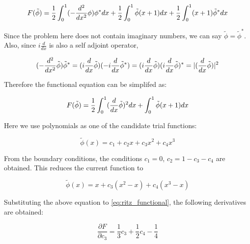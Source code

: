 \documentclass[a4paper,12pt]{report}
\begin{document}
\begin{equation}
  F(\tilde{\phi}) = \frac{1}{2}\int_{0}^1 (-\frac{d^2}{dx^2}\phi) \phi^* dx \\
  + \frac{1}{2}\int_{0}^1 \tilde{\phi}(x + 1) dx \\
  + \frac{1}{2}\int_{0}^1 (x + 1)\tilde{\phi}^* dx
\end{equation}

Since the problem here does not contain imaginary numbers,
we can say $\tilde{\phi} = \tilde{\phi}^*$.
Also, since $i\frac{d}{dx}$ is also a self adjoint operator,

\begin{equation}
  (-\frac{d^2}{dx^2}\tilde{\phi}) \tilde{\phi}^* = \\
  (i\frac{d}{dx}\tilde{\phi})(-i\frac{d}{dx}\tilde{\phi}^*) \\
  = (i\frac{d}{dx}\tilde{\phi})(i\frac{d}{dx}\tilde{\phi})^* \\
  = |(\frac{d}{dx}\tilde{\phi})|^2
\end{equation}

Therefore the functional equation can be simplifed as:

\begin{equation} \label{eq:ritz_functional}
  F(\tilde{\phi}) = \frac{1}{2}\int_{0}^1 (\frac{d}{dx}\tilde{\phi})^2 dx \\
  + \int_{0}^1 \tilde{\phi}(x + 1) dx
\end{equation}

Here we use polynomials as one of the candidate trial functions:

\begin{equation}
  \tilde{\phi}(x) = c_1 + c_2 x + c_3 x^2 + c_4 x^3
\end{equation}

From the boundary conditions,
the conditions $c_1 = 0$, $c_2 = 1 - c_3 - c_4$ are obtained.
This reduces the current function to

\begin{equation}
  \tilde{\phi}(x) = x + c_3 (x^2 - x) + c_4 (x^3 - x)
\end{equation}

Substituting the above equation to \ref{eq:ritz_functional},
the following derivatives are obtained:

\begin{equation}
  \frac{\partial F}{\partial c_3} = \frac{1}{3}c_3 + \frac{1}{2} c_4 - \frac{1}{4}
\end{equation}
\end{document}
